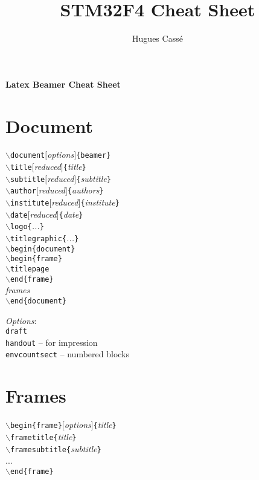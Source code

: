 \documentclass[a4paper,landscape]{article}
\title{STM32F4 Cheat Sheet}
\author{Hugues Cassé}
\newcommand{\cmd}[1]{\texttt{$\backslash$#1}}
\newcommand{\cmdarg}[2]{\texttt{$\backslash$#1\{}\textit{#2}\texttt{\}}}
\newcommand{\dobegin}[1]{\texttt{$\backslash$begin\{#1\}}}
\newcommand{\doend}[1]{\texttt{$\backslash$end\{#1\}}}
\newcommand{\tab}{\hspace*{5mm}}
\begin{document}

\begin{center}
	\textbf{\LARGE Latex Beamer Cheat Sheet}	
\end{center}

\begin{multicols*}{3}

\section*{Document}

\cmd{document}$[$\textit{options}$]$\texttt{\{beamer\}} \\
\cmd{title}$[$\textit{reduced}$]$\texttt{\{}\textit{title}\texttt{\}} \\
\cmd{subtitle}$[$\textit{reduced}$]$\texttt{\{}\textit{subtitle}\texttt{\}} \\
\cmd{author}$[$\textit{reduced}$]$\texttt{\{}\textit{authors}\texttt{\}} \\
\cmd{institute}$[$\textit{reduced}$]$\texttt{\{}\textit{institute}\texttt{\}} \\
\cmd{date}$[$\textit{reduced}$]$\texttt{\{}\textit{date}\texttt{\}} \\
\cmdarg{logo}{...} \\
\cmdarg{titlegraphic}{...} \\

\dobegin{document} \\
	\dobegin{frame} \\
		\tab \cmd{titlepage} \\
	\doend{frame} \\
	\tab \textit{frames} \\
\doend{document}

\medskip
\textit{Options}: \\
	\tab \texttt{draft} \\
	\tab \texttt{handout} -- for impression \\
	\tab \texttt{envcountsect} -- numbered blocks 


\section*{Frames}

\dobegin{frame}[\textit{options}]\texttt{\{}\textit{title}\texttt{\}} \\
	\tab \cmdarg{frametitle}{\textit{title}} \\
	\tab \cmdarg{framesubtitle}{\textit{subtitle}} \\
	\tab ... \\
\doend{frame}


\end{multicols*}
\end{document}
